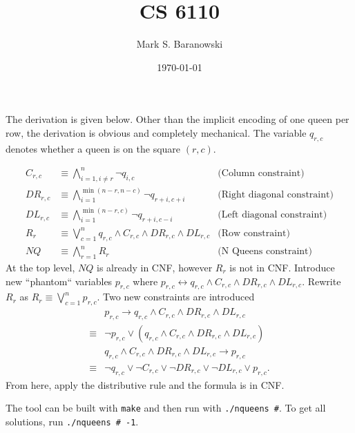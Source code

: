 \documentclass[paper=a4, fontsize=11pt]{scrartcl} %
\title{	
\normalfont \normalsize 
\textsc{CS 6110} \\ %
}
\author{Mark S. Baranowski} %
\date{\normalsize\today} %
\numberwithin{equation}{section} %
\numberwithin{figure}{section} %
\numberwithin{table}{section} %
\begin{document}
\maketitle %

The derivation is given below. Other than the implicit encoding of one queen per row, the derivation is obvious and completely mechanical. The variable $q_{r,c}$ denotes whether a queen is on the square $(r,c)$.

\begin{align*}
C_{r,c} & \equiv \bigwedge_{i=1, i \ne r}^n \neg q_{i,c} & \text{(Column constraint)}\\
DR_{r,c} & \equiv \bigwedge_{i=1}^{\min(n-r, n-c)}\neg q_{r+i, c+i} & \text{(Right diagonal constraint)}\\
DL_{r,c} & \equiv \bigwedge_{i=1}^{\min(n-r, c)}\neg q_{r+i, c-i} & \text{(Left diagonal constraint)}\\
R_{r} &\equiv \bigvee_{c=1}^n q_{r,c} \wedge C_{r,c}\wedge DR_{r,c} \wedge DL_{r,c} &\text{(Row constraint)}\\
NQ &\equiv \bigwedge_{r=1}^nR_r & \text{(N Queens constraint)}
\end{align*}
At the top level, $NQ$ is already in CNF, however $R_r$ is not in CNF. Introduce new ``phantom`` variables $p_{r,c}$ where
$p_{r,c}\leftrightarrow q_{r,c} \wedge C_{r,c}\wedge DR_{r,c} \wedge DL_{r,c}.$
Rewrite $R_r$ as $R_r \equiv \bigvee_{c=1}^n p_{r,c}.$
Two new constraints are introduced
\begin{align*}
&p_{r,c} \rightarrow q_{r,c} \wedge C_{r,c} \wedge DR_{r,c} \wedge DL_{r,c}\\
\equiv&\neg p_{r,c} \vee (q_{r,c} \wedge C_{r,c} \wedge DR_{r,c} \wedge DL_{r,c})\\
&q_{r,c} \wedge C_{r,c} \wedge DR_{r,c} \wedge DL_{r,c}\rightarrow p_{r,c}\\
\equiv&\neg q_{r,c} \vee \neg C_{r,c} \vee \neg DR_{r,c} \vee \neg DL_{r,c} \vee p_{r,c}.
\end{align*}
From here, apply the distributive rule and the formula is in CNF.

The tool can be built with {\tt make} and then run with {\tt ./nqueens \#}. To get all solutions, run {\tt ./nqueens \# -1}.
\end{document}
